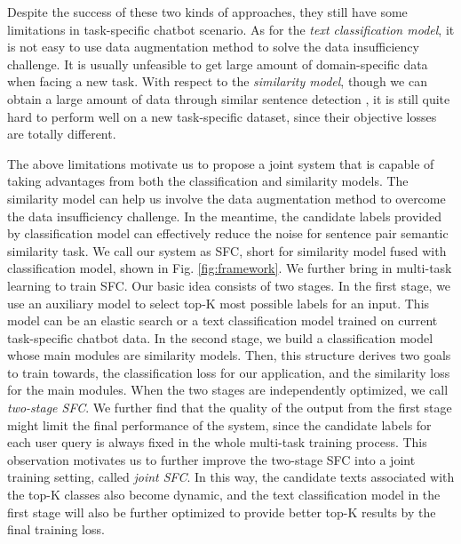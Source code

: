 Despite  the  success  of  these two kinds of approaches, they still have some
limitations   in   task-specific  chatbot  scenario.  As  for  the  \emph{text
classification  model},  it  is  not  easy to use data augmentation method to
solve  the  data insufficiency challenge. It is usually unfeasible to
get  large amount of domain-specific data when facing a new task. With respect
to  the  \emph{similarity model}, though we can obtain a large amount of data
through similar sentence detection  \cite{sun2019fine},  it  is  still  quite  hard  to  perform well on
a new task-specific dataset,  since their objective losses are totally different. 

The  above  limitations motivate us to propose a joint system that is capable of
taking  advantages  from both the classification and similarity models. The similarity
model can help us involve the data augmentation method to overcome the data insufficiency
challenge. In the meantime, the candidate labels provided by classification model can 
effectively reduce the noise for sentence pair semantic similarity task. We call
our system as SFC,  short  for  similarity model fused with classification model, shown in
Fig.  \ref{fig:framework}.  We further bring in multi-task learning   \cite{caruana1993multitask,collobert2008unified,  liu2019multi} to train SFC.  
Our basic  idea  consists of two stages. In the first stage, we use an auxiliary model
to  select  top-K most possible labels for an input. This model can be an elastic
search  \cite{divya2013elasticsearch}  or a text classification model trained on
current   task-specific   chatbot   data.  In  the  second  stage,  we  build  a
classification  model  whose  main  modules  are  similarity  models. Then, this
structure  derives  two  goals to train towards, the classification loss for our
application,  and  the similarity loss for the main modules. When the two stages
are  independently optimized, we call \emph{two-stage SFC}. We further find that
the  quality of the output from the first stage might limit the final performance of the
system,  since  the  candidate labels for each user query is always fixed in the
whole  multi-task  training  process.  This  observation motivates us to further
improve  the  two-stage  SFC  into a joint training setting, called \emph{joint SFC}. In
this  way,  the  candidate texts associated  with the top-K classes also become
dynamic,  and  the  text  classification  model  in the first stage will also be
further optimized to provide better top-K results by the final training loss.


